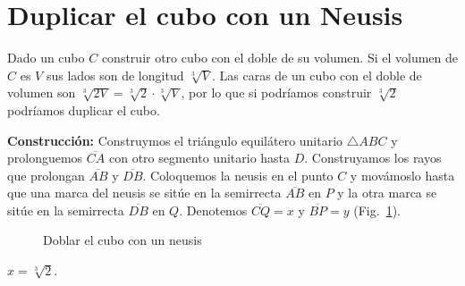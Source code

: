 \section{Duplicar el cubo con un Neusis}\label{s.neusis-doubling}

Dado un cubo $C$ construir otro cubo con el doble de su volumen. Si el volumen de $C$ es $V$ sus lados son de longitud $\sqrt[3]{V}$. Las caras de un cubo con el doble de volumen son $\sqrt[3]{2 V}=\sqrt[3]{2}\cdot\sqrt[3]{V}$, por lo que si podríamos construir $\sqrt[3]{2}$ podríamos duplicar el cubo.

\noindent\textbf{Construcción:}
Construymos el triángulo equilátero unitario $\triangle ABC$ y prolonguemos $\overline{CA}$ con otro segmento unitario hasta $D$. Construyamos los rayos que prolongan $\overline{AB}$ y $\overline{DB}$. Coloquemos la neusis en el punto $C$ y movámoslo hasta que una marca del neusis se sitúe en la semirrecta $\overline{AB}$ en $P$ y la otra marca se sitúe en la semirrecta $\overline{DB}$ en $Q$. Denotemos $\overline{CQ}=x$ y $\overline{BP}=y$ (Fig.~\ref{f.double-neusis}).

\begin{figure}[t]
\begin{center}
\end{center}
\caption{Doblar el cubo con un neusis}\label{f.double-neusis}
\end{figure}

\newpage

\begin{theorem}
$x=\sqrt[3]{2}$.
\end{theorem}

